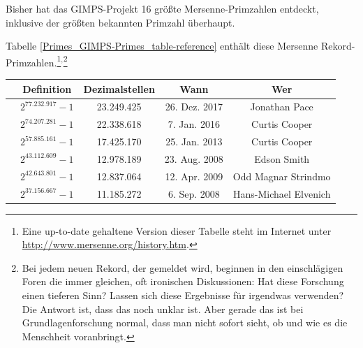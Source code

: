 \begin{refsegment}
\begin{sloppypar}
Bisher hat das GIMPS-Projekt 16  %
größte Mersenne-Primzahlen entdeckt, inklusive der größten bekannten
Primzahl überhaupt.
\end{sloppypar}

Tabelle \ref{Primes_GIMPS-Primes_table-reference} enthält diese Mersenne
Rekord-Primzahlen.\footnote{%
Eine up-to-date gehaltene Version dieser Tabelle steht im Internet unter
     \url{http://www.mersenne.org/history.htm}.%
}$^,$\footnote{%
Bei jedem neuen Rekord, der gemeldet wird, beginnen in den einschlägigen
Foren die immer gleichen, oft ironischen Diskussionen: Hat diese Forschung
einen tieferen Sinn? Lassen sich diese Ergebnisse für irgendwas verwenden?\\
Die Antwort ist, dass das noch unklar ist. Aber gerade das ist bei
Grundlagenforschung normal, dass man nicht sofort sieht, ob und wie es die
Menschheit voranbringt.
}

\ignoreoutput{\rowno[0]}
\begin{table}[ht]
\begin{center}
\begin{tabular}{|c|cccc|}
\hline \rule{0pt}{10pt}
	& {\bf Definition} & {\bf Dezimalstellen} & {\bf Wann} & {\bf Wer} \\
\hline \rule{0pt}{15pt}

	\rowno & $2^{77.232.917}-1$ & 23.249.425 & 26. Dez. 2017 & Jonathan Pace  \\
	\rowno & $2^{74.207.281}-1$ & 22.338.618 & 7. Jan. 2016 & Curtis Cooper  \\
	\rowno & $2^{57.885.161}-1$ & 17.425.170 & 25. Jan. 2013 & Curtis Cooper  \\
	\rowno & $2^{43.112.609}-1$ & 12.978.189 & 23. Aug. 2008 & Edson Smith  \\
	\rowno & $2^{42.643.801}-1$ & 12.837.064 & 12. Apr. 2009 & Odd Magnar Strindmo \\
	\rowno & $2^{37.156.667}-1$ & 11.185.272 & 6. Sep. 2008 & Hans-Michael Elvenich \\


\end{tabular}
\end{center}
\end{table}
\end{refsegment}

